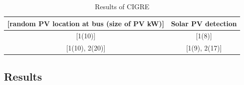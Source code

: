 \begin{table}[h]
  \caption{Results of CIGRE}
  \begin{tabular}{cc}
    \hline
  {[}random PV location at bus (size of PV kW){]} & Solar PV detection \\
\hline
  {[}1(10){]}                                     & {[}1(8){]}         \\
  {[}1(10), 2(20){]}                              & {[}1(9), 2(17){]}\\
  \hline
  \end{tabular}
  \label{tab.res_2}
\end{table}



\subsection{Results}
